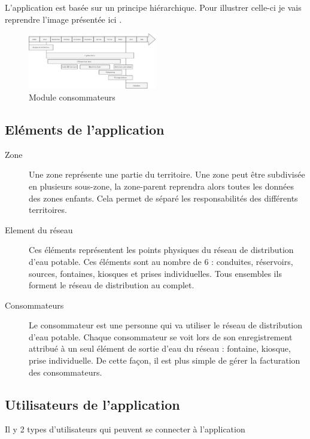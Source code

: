 \documentclass{EPL-master-thesis-covers-FR}
\begin{document}
				L'application est basée sur un principe hiérarchique. Pour illustrer celle-ci je vais reprendre l'image présentée ici \cite{ref:haitiwater}. 
				
				\begin{figure}[H]
					\centering
					\includegraphics[width=0.5\textwidth]{images/Gantt}
					\caption{Module consommateurs}
				\end{figure}
				
				
			\subsection{Eléments de l'application}
				\begin{description}
					\item[Zone] Une zone représente une partie du territoire. Une zone peut être subdivisée en plusieurs sous-zone, la zone-parent reprendra alors toutes les données des zones enfants. Cela permet de séparé les responsabilités des différents territoires.
					\item[Element du réseau] Ces éléments représentent les points physiques du réseau de distribution d'eau potable. Ces éléments sont au nombre de 6 : conduites, réservoirs, sources, fontaines, kiosques et prises individuelles. Tous ensembles ils forment le réseau de distribution au complet. 
					\item[Consommateurs] Le consommateur est une personne qui va utiliser le réseau de distribution d'eau potable. Chaque consommateur se voit lors de son enregistrement attribué à un seul élément de sortie d'eau du réseau : fontaine, kiosque, prise individuelle. De cette façon, il est plus simple de gérer la facturation des consommateurs.
				\end{description}
				
			
				
				
			\subsection{Utilisateurs de l'application}
				Il y 2 types d'utilisateurs qui peuvent se connecter à l'application
				
\end{document}
